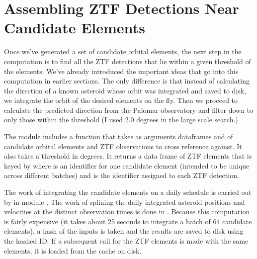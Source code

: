 \section{Assembling ZTF Detections Near Candidate Elements}
\label{section_ztf_elements}
Once we've generated a set of candidate orbital elements, 
the next step in the computation is to find all the ZTF detections that lie within a given threshold of the elements.
We've already introduced the important ideas that go into this computation in earlier sections.
The only difference is that instead of calculating the direction of a known asteroid whose orbit was integrated and saved to disk, 
we integrate the orbit of the desired elements on the fly.
Then we proceed to calculate the predicted direction from the Palomar observatory and filter down to only those within the threshold
(I used 2.0 degrees in the large scale search.)

The module  includes a function  that takes as arguments dataframes  and 
of candidate orbital elements and ZTF observations to cross reference against.
It also takes a threshold in degrees.
It returns a data frame of ZTF elements that is keyed by 
where  is an identifier for one candidate element (intended to be unique across different batches)
and  is the identifier assigned to each ZTF detection.

The work of integrating the candidate elements on a daily schedule is carried out by  in module .
The work of splining the daily integrated asteroid positions and velocities at the distinct observation times is done in .
Because this computation is fairly expensive (it takes about 25 seconds to integrate a batch of 64 candidate elements),
a hash of the inputs is taken and the results are saved to disk using the hashed ID.
If a subsequent call for the ZTF elements is made with the same elements, it is loaded from the cache on disk.

